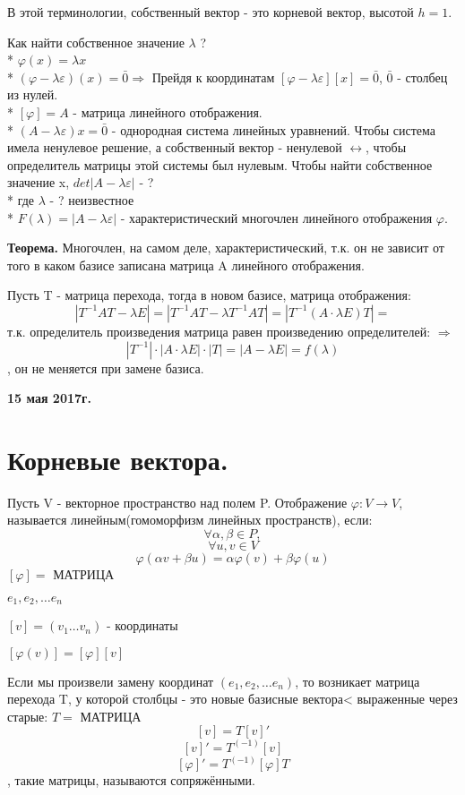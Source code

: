 \documentclass{article}
\begin{document}
В этой терминологии, собственный вектор - это корневой вектор, высотой $h=1$.

Как найти собственное значение $\lambda$ ?\\*
$\varphi(x)=\lambda x$\\*
$(\varphi-\lambda\varepsilon)(x)=\bar{0}\Rightarrow$ Прейдя к координатам  $[\varphi-\lambda\varepsilon][x]=\bar{0}$, $\bar{0}$ -  столбец из нулей.\\*
$[\varphi]=A$ - матрица линейного отображения.\\*
$(A-\lambda\varepsilon)x=\bar{0}$ - однородная система линейных уравнений. Чтобы система имела ненулевое решение, а собственный вектор - ненулевой $\leftrightarrow$, чтобы определитель матрицы этой системы был нулевым. Чтобы найти собственное значение x, $det|A-\lambda\varepsilon|$ - ?\\*
где $\lambda$ - ? неизвестное\\*
$F(\lambda)=|A-\lambda\varepsilon|$ - характеристический многочлен линейного отображения $\varphi$.

{\bf Теорема.} Многочлен, на самом деле, характеристический, т.к. он не зависит от того в каком базисе записана матрица A линейного отображения.

Пусть T - матрица перехода, тогда в новом базисе, матрица отображения:
$$|T^{-1} AT - \lambda E| = |T^{-1} AT - \lambda T^{-1}AT|=|T^{-1}(A\cdot\lambda E)T|=$$ т.к. определитель произведения матрица равен произведению определителей: $\Rightarrow$ $$|T^{-1}|\cdot|A\cdot\lambda E|\cdot|T|=|A-\lambda E|=f(\lambda)$$, он не меняется при замене базиса.

\textbf {15 мая 2017г.}

\section*{Корневые вектора.}
Пусть V - векторное пространство над полем P. Отображение $\varphi:V\to V$, называется линейным(гомоморфизм линейных пространств), если:
$$\forall \alpha,\beta \in P,$$
$$\forall u, v \in V$$
$$\varphi(\alpha v + \beta u)=\alpha\varphi(v)+\beta\varphi(u)$$
$[\varphi]=$ МАТРИЦА

$e_1, e_2, \ldots e_n$

$[v]=(v_1\ldots v_n)$ - координаты

$[\varphi(v)]=[\varphi][v]$

Если мы произвели замену координат $(e_1, e_2, \ldots e_n)$, то возникает матрица перехода T, у которой столбцы - это новые базисные вектора< выраженные через старые: $T=$ МАТРИЦА
$$[v]=T[v]'$$
$$[v]'=T^(-1)[v]$$
$$[\varphi]'=T^(-1)[\varphi]T$$, такие матрицы, называются сопряжёнными.
\end{document}
